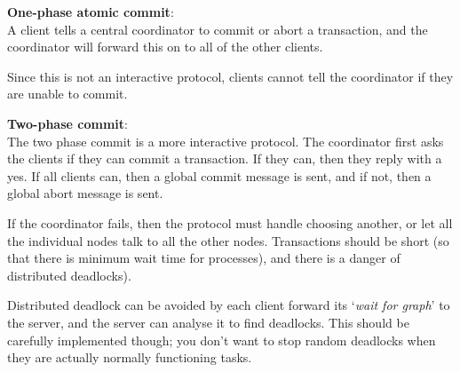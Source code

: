 \begin{description}
  \item \textbf{One-phase atomic commit}:\\
    A client tells a central coordinator to commit or abort a transaction, and
    the coordinator will forward this on to all of the other clients.

    Since this is not an interactive protocol, clients cannot tell the
    coordinator if they are unable to commit.

  \item \textbf{Two-phase commit}:\\
    The two phase commit is a more interactive protocol. The coordinator first
    asks the clients if they can commit a transaction. If they can, then they
    reply with a yes. If all clients can, then a global commit message is sent,
    and if not, then a global abort message is sent.

    If the coordinator fails, then the protocol must handle choosing another, or
    let all the individual nodes talk to all the other nodes. Transactions
    should be short (so that there is minimum wait time for processes), and
    there is a danger of distributed deadlocks).

    Distributed deadlock can be avoided by each client forward its `\textit{wait
    for graph}' to the server, and the server can analyse it to find deadlocks.
    This should be carefully implemented though; you don't want to stop random
    deadlocks when they are actually normally functioning tasks.
\end{description}
